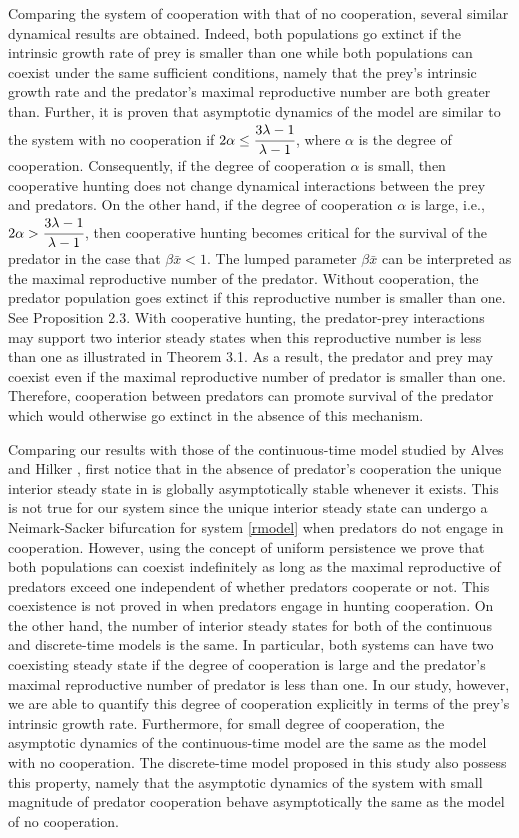 \documentclass[11pt]{article}
\begin{document}
Comparing the system of  cooperation with that of no cooperation,
several similar dynamical results are obtained. Indeed, both
populations go extinct if the intrinsic growth rate of prey is
smaller than one while both populations can coexist under the same
sufficient conditions, namely that the prey's intrinsic growth
rate and the predator's  maximal reproductive number are both
greater than. Further, it is proven that asymptotic dynamics of
the model are similar to the system with no cooperation if
$2\alpha\leq \cfrac{3\lambda-1}{\lambda-1}$, where $\alpha$ is the
degree of cooperation. Consequently,  if the degree of cooperation
$\alpha$ is small, then cooperative hunting does not change
dynamical interactions between the prey and predators. On the
other hand, if
 the degree of cooperation $\alpha$ is large, i.e., $2\alpha>\cfrac{3\lambda-1}{\lambda-1}$,
then cooperative hunting becomes critical for the survival of the
predator in the case that $\beta  \bar x<1$. The lumped parameter
$\beta  \bar x$ can be interpreted as the maximal reproductive
number of the predator. Without cooperation, the predator
population goes extinct if this reproductive number is smaller
than one. See Proposition 2.3. With cooperative hunting, the
predator-prey interactions may support two interior steady states
when this reproductive number is less than one as illustrated in
Theorem 3.1. As a result, the predator and prey may coexist even
if the maximal reproductive number of predator is smaller than
one. Therefore, cooperation between predators can promote survival
of the predator which would otherwise go  extinct in the absence
of this mechanism.

Comparing our results with those of the continuous-time model
studied by Alves and Hilker \cite{alves}, first notice that in the
absence of predator's cooperation the unique interior steady state
in \cite{alves} is globally asymptotically stable whenever it
exists. This is not true for our system since the unique interior
steady state  can undergo a Neimark-Sacker bifurcation  for system
\eqref{rmodel} when  predators do not engage in cooperation.
However, using the concept of uniform persistence we prove that
both populations can coexist indefinitely as long as the maximal
reproductive of predators exceed one independent of whether
predators cooperate or not. This coexistence is not proved in
\cite{alves} when predators engage in hunting cooperation. On the
other hand, the number of interior steady states for both of the
continuous and discrete-time models is the same. In particular,
both systems can have two coexisting steady state if the degree of
cooperation is large and  the predator's maximal reproductive
number of predator is less than one. In our study, however, we are
able to quantify this degree of cooperation explicitly in terms of
the prey's intrinsic growth rate. Furthermore, for small degree of
cooperation, the asymptotic dynamics of the continuous-time model
are the same as the model with no cooperation. The discrete-time
model proposed in this study also possess this property, namely
that the asymptotic dynamics of the system with small magnitude of
predator cooperation behave asymptotically the same as the model
of no cooperation.
\end{document}

